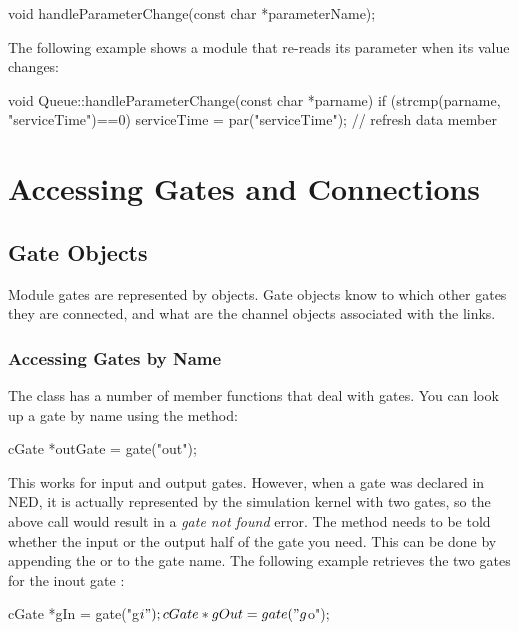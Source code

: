 \begin{cpp}
void handleParameterChange(const char *parameterName);
\end{cpp}

The following example shows a module that re-reads
its  parameter when its value changes:

\begin{cpp}
void Queue::handleParameterChange(const char *parname)
{
    if (strcmp(parname, "serviceTime")==0)
        serviceTime = par("serviceTime"); // refresh data member
}
\end{cpp}


\section{Accessing Gates and Connections}
\label{sec:simple-modules:gates}

\subsection{Gate Objects}

Module gates are represented by  objects.
Gate objects know to which other gates they are connected, and
what are the channel objects associated with the links.

\subsubsection{Accessing Gates by Name}

The  class has a number of member functions that
deal with gates. You can look up a gate by name using the 
method:

\begin{cpp}
cGate *outGate = gate("out");
\end{cpp}

This works for input and output gates. However, when a gate was declared
 in NED, it is actually represented by the simulation kernel
with two gates, so the above call would result in a \textit{gate not found}
error. The  method needs to be told whether the input or
the output half of the gate you need. This can be done by appending
the  or  to the gate name. The following example
retrieves the two gates for the inout gate :

\begin{cpp}
cGate *gIn = gate("g$i");
cGate *gOut = gate("g$o");
\end{cpp}

